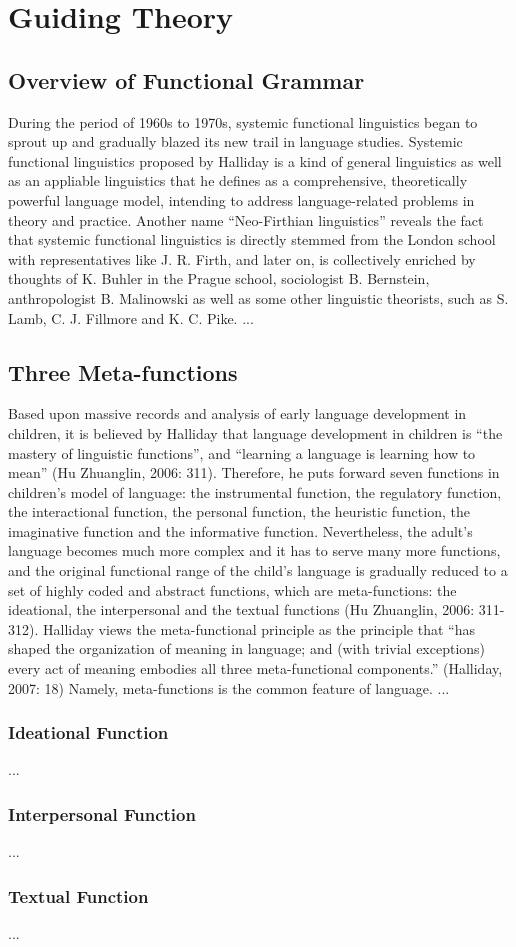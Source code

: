 \chapter{Guiding Theory}
\section{Overview of Functional Grammar}
During the period of 1960s to 1970s, systemic functional linguistics began to sprout up and gradually blazed its new trail in language studies. Systemic functional linguistics proposed by Halliday is a kind of general linguistics as well as an appliable linguistics that he defines as a comprehensive, theoretically powerful language model, intending to address language-related problems in theory and practice. Another name “Neo-Firthian linguistics” reveals the fact that systemic functional linguistics is directly stemmed from the London school with representatives like J. R. Firth, and later on, is collectively enriched by thoughts of K. Buhler in the Prague school, sociologist B. Bernstein, anthropologist B. Malinowski as well as some other linguistic theorists, such as S. Lamb, C. J. Fillmore and K. C. Pike. 
...
\section{Three Meta-functions}
Based upon massive records and analysis of early language development in children, it is believed by Halliday that language development in children is “the mastery of linguistic functions”, and “learning a language is learning how to mean” (Hu Zhuanglin, 2006: 311). Therefore, he puts forward seven functions in children’s model of language: the instrumental function, the regulatory function, the interactional function, the personal function, the heuristic function, the imaginative function and the informative function. Nevertheless, the adult’s language becomes much more complex and it has to serve many more functions, and the original functional range of the child’s language is gradually reduced to a set of highly coded and abstract functions, which are meta-functions: the ideational, the interpersonal and the textual functions (Hu Zhuanglin, 2006: 311-312). Halliday views the meta-functional principle as the principle that “has shaped the organization of meaning in language; and (with trivial exceptions) every act of meaning embodies all three meta-functional components.” (Halliday, 2007: 18) Namely, meta-functions is the common feature of language.
...
	\subsection{Ideational Function}
	    ...
	\subsection{Interpersonal Function}
		...
	\subsection{Textual Function}
	...